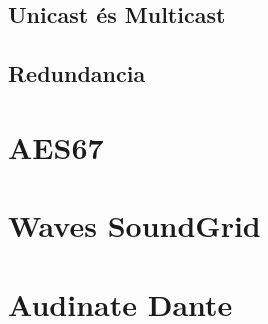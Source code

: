 \subsection{Unicast és Multicast}

\subsection{Redundancia}

\section{AES67}

\section{Waves SoundGrid} 


\section{Audinate Dante}


